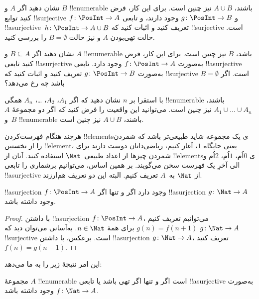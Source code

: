 \documentclass[../../../include/open-logic-section]{subfiles}
\begin{document}
\begin{prob}
  نشان دهید اگر $A$ و $B$ !!{enumerable} باشند، $A \cup B$ نیز چنین
  است. برای این کار، فرض کنید توابع !!{surjective} $f\colon \PosInt \to
  A$ و $g\colon \PosInt \to B$ وجود دارند، و تابعی
  !!a{surjective}~$h\colon \PosInt \to A \cup B$ تعریف کنید و اثبات کنید که
  !!{surjective} است. حالت تهی‌بودن $A$ و نیز حالت $B = \emptyset$ را بررسی کنید.
\end{prob}

\begin{prob}
  نشان دهید اگر $B \subseteq A$ و $A$ !!{enumerable} باشد، $B$ نیز چنین
  است. برای این کار، فرض کنید تابعی !!a{surjective} به‌صورت $f\colon \PosInt \to
  A$ وجود دارد. تابعی !!a{surjective} به‌صورت $g\colon \PosInt \to B$
  تعریف کنید و اثبات کنید که !!{surjective} است. اگر $B = \emptyset$ باشد چه رخ می‌دهد؟
\end{prob}

\begin{prob}
  با استقرا بر $n$ نشان دهید که اگر $A_1$، $A_2$، \dots، $A_n$ همگی
  !!{enumerable} باشند، $A_1 \cup \dots \cup A_n$ نیز چنین است. می‌توانید
  این واقعیت را فرض کنید که اگر دو مجموعهٔ $A$ و~$B$ !!{enumerable}
  باشند، $A \cup
  B$ نیز چنین است.
\end{prob}

هرچند هنگام فهرست‌کردن !!{element}sی یک مجموعه شاید طبیعی‌تر باشد که
شمردن را از نخستین !!{element}، یعنی جایگاه $1$، آغاز کنیم، ریاضی‌دانان
دوست دارند برای شمردن چیزها از اعداد طبیعی~$\Nat$ استفاده کنند. آنان از
!!{element}sی $0$اُم، $1$اُم، $2$اُم و الی آخرِ یک فهرست سخن
می‌گویند. بر همین اساس، می‌توانیم برشماری را تابعی !!a{surjective} از
$\Nat$ به~$A$ تعریف کنیم. البته این دو تعریف هم‌ارزند.

\begin{prop}
  !!a{surjection} $f\colon \PosInt \to A$ وجود دارد اگر و تنها اگر
  !!a{surjection} $g\colon \Nat \to A$ وجود داشته باشد.
\end{prop}

\begin{proof}
  با داشتن !!a{surjection} $f\colon \PosInt \to A$، می‌توانیم تعریف کنیم
  $g(n) =
  f(n+1)$ برای همهٔ $n \in \Nat$. به‌آسانی می‌توان دید که $g\colon \Nat
  \to A$ !!{surjective} است. برعکس، با داشتن !!a{surjection} $g\colon
  \Nat \to A$، تعریف کنید $f(n) = g(n-1)$.
\end{proof}

این امر نتیجهٔ زیر را به ما می‌دهد:

\begin{cor}
مجموعهٔ $A$ !!{enumerable} است اگر و تنها اگر تهی باشد یا تابعی
!!a{surjective} به‌صورت $f\colon \Nat \to A$ وجود داشته باشد.
\end{cor}
\end{document}
